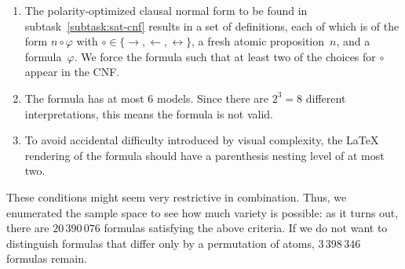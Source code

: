 \begin{enumerate}
    \item
        The polarity-optimized clausal normal form
        to be found in subtask~\ref{subtask:sat-cnf} results in a set of definitions,
        each of which is of the form
        $n \circ \varphi$ with $\circ \in \{ \rightarrow, \leftarrow, \leftrightarrow \}$,
        a fresh atomic proposition~$n$, and a formula~$\varphi$.
        We force the formula such that at least two of the choices for $\circ$ appear in the CNF.
    \item
        The formula has at most $6$ models.
        Since there are $2^3 = 8$ different interpretations,
        this means the formula is not valid.
    \item
        To avoid accidental difficulty introduced by visual complexity,
        the \LaTeX{} rendering of the formula should have a parenthesis nesting level of at most two.
\end{enumerate}

These conditions might seem very restrictive in combination.
Thus, we enumerated the sample space to see how much variety is possible:
as it turns out, there are $20\,390\,076$ formulas satisfying the above criteria.
If we do not want to distinguish formulas that differ only by a permutation of atoms,
$3\,398\,346$ formulas remain.





